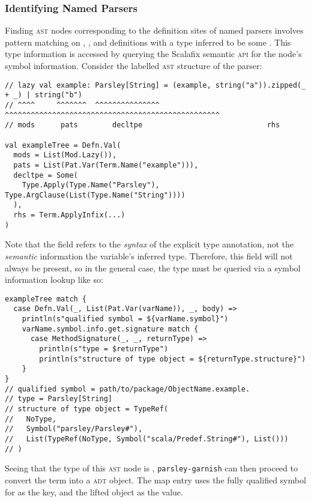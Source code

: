 \documentclass[../../main.tex]{subfiles}
\begin{document}
\subsubsection{Identifying Named Parsers}
Finding \textsc{ast} nodes corresponding to the definition sites of named parsers involves pattern matching on , , and  definitions with a type inferred to be some .
This type information is accessed by querying the Scalafix semantic \textsc{api} for the node's symbol information.
Consider the labelled \textsc{ast} structure of the  parser:
\begin{verbatim}
// lazy val example: Parsley[String] = (example, string("a")).zipped(_ + _) | string("b")
// ^^^^     ^^^^^^^  ^^^^^^^^^^^^^^^   ^^^^^^^^^^^^^^^^^^^^^^^^^^^^^^^^^^^^^^^^^^^^^^^^^^
// mods      pats        decltpe                             rhs

val exampleTree = Defn.Val(
  mods = List(Mod.Lazy()),
  pats = List(Pat.Var(Term.Name("example"))),
  decltpe = Some(
    Type.Apply(Type.Name("Parsley"), Type.ArgClause(List(Type.Name("String"))))
  ),
  rhs = Term.ApplyInfix(...)
)
\end{verbatim}
%
Note that the \scala{decltpe} field refers to the \emph{syntax} of the explicit type annotation, not the \emph{semantic} information the variable's inferred type.
Therefore, this field will not always be present, so in the general case, the type must be queried via a symbol information lookup like so:
\begin{verbatim}
exampleTree match {
  case Defn.Val(_, List(Pat.Var(varName)), _, body) =>
    println(s"qualified symbol = ${varName.symbol}")
    varName.symbol.info.get.signature match {
      case MethodSignature(_, _, returnType) =>
        println(s"type = $returnType")
        println(s"structure of type object = ${returnType.structure}")
    }
}
// qualified symbol = path/to/package/ObjectName.example.
// type = Parsley[String]
// structure of type object = TypeRef(
//   NoType,
//   Symbol("parsley/Parsley#"),
//   List(TypeRef(NoType, Symbol("scala/Predef.String#"), List()))
// )
\end{verbatim}
Seeing that the type of this \textsc{ast} node is , \texttt{parsley-garnish} can then proceed to convert the  term into a  \textsc{adt} object.
The map entry uses the fully qualified symbol for \scala{example} as the key, and the lifted \scala{Parser} object as the value.
\end{document}
